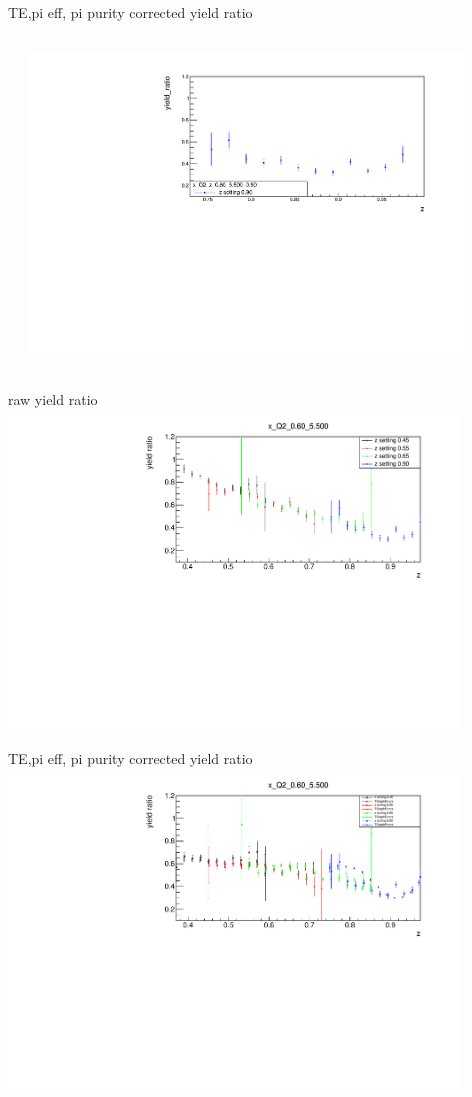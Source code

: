 \begin{frame}{TE,pi eff, pi purity corrected yield ratio}
\begin{columns}
\begin{column}[T]{0.5\textwidth}
\end{column}
\begin{column}[T]{0.5\textwidth}
\includegraphics[width = 0.9\textwidth]{results/yield/statistics_corr/x_Q2_z_0.60_5.500_0.90_ratio.pdf}
\end{column}
\end{columns}
\end{frame}
\begin{frame}{raw yield ratio}
\includegraphics[width = 0.9\textwidth]{results/yield/statistics/x_Q2_0.60_5.500_ratio.pdf}
\end{frame}
\begin{frame}{TE,pi eff, pi purity corrected yield ratio}
\includegraphics[width = 0.9\textwidth]{results/yield/statistics_corr/x_Q2_0.60_5.500_ratio.pdf}
\end{frame}
